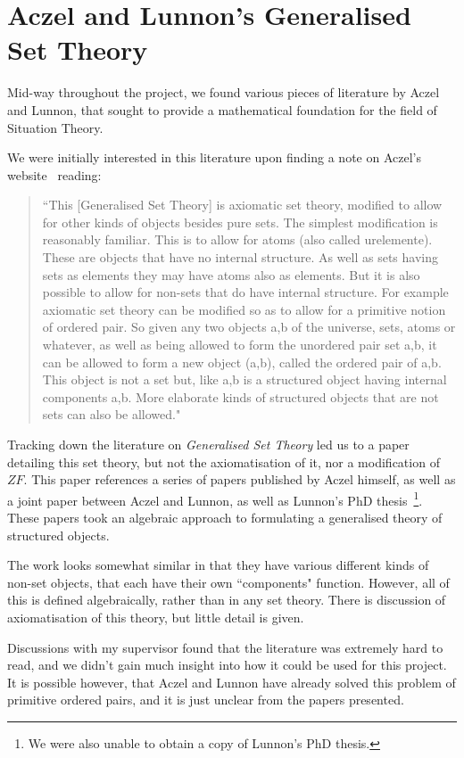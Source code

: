 \documentclass[11pt]{report}
\theoremstyle{definition}
\theoremstyle{theorem}
\theoremstyle{lemma}
\begin{document}
\section{Aczel and Lunnon's Generalised Set Theory}
Mid-way throughout the project, we found various pieces of literature by Aczel and Lunnon, that sought to provide a mathematical foundation for the field of Situation Theory.

We were initially interested in this literature upon finding a note on Aczel's website~\cite{aczelsite} reading: 
\begin{quotation}
\begin{small}
\noindent
``This [Generalised Set Theory] is axiomatic set theory, modified to allow for other kinds of objects besides pure sets. The simplest modification is reasonably familiar. This is to allow for atoms (also called urelemente). These are objects that have no internal structure. As well as sets having sets as elements they may have atoms also as elements. But it is also possible to allow for non-sets that do have internal structure. For example axiomatic set theory can be modified so as to allow for a primitive notion of ordered pair. So given any two objects a,b of the universe, sets, atoms or whatever, as well as being allowed to form the unordered pair set {a,b}, it can be allowed to form a new object (a,b), called the ordered pair of a,b. This object is not a set but, like {a,b} is a structured object having internal components a,b. More elaborate kinds of structured objects that are not sets can also be allowed."
\end{small}
\end{quotation}
Tracking down the literature on \emph{Generalised Set Theory} led us to a paper~\cite{gst} detailing this set theory, but not the axiomatisation of it, nor a modification of $ZF$. 
This paper references a series of papers published by Aczel himself, as well as a joint paper between Aczel and Lunnon, as well as Lunnon's PhD thesis~\footnote{We were also unable to obtain a copy of Lunnon's PhD thesis.}.
These papers took an algebraic approach to formulating a generalised theory of structured objects.

The work looks somewhat similar in that they have various different kinds of non-set objects, that each have their own ``components" function. 
However, all of this is defined algebraically, rather than in any set theory. 
There is discussion of axiomatisation of this theory, but little detail is given. 

Discussions with my supervisor found that the literature was extremely hard to read, and we didn't gain much insight into how it could be used for this project.
It is possible however, that Aczel and Lunnon have already solved this problem of primitive ordered pairs, and it is just unclear from the papers presented. 
\end{document}
